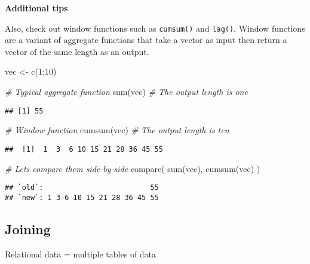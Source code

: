 \documentclass[
]{book}
\newenvironment{Shaded}{\begin{snugshade}}{\end{snugshade}}
\newcommand{\CommentTok}[1]{\textcolor[rgb]{0.56,0.35,0.01}{\textit{#1}}}
\newcommand{\DecValTok}[1]{\textcolor[rgb]{0.00,0.00,0.81}{#1}}
\newcommand{\FunctionTok}[1]{\textcolor[rgb]{0.00,0.00,0.00}{#1}}
\newcommand{\NormalTok}[1]{#1}
\newcommand{\OtherTok}[1]{\textcolor[rgb]{0.56,0.35,0.01}{#1}}
\newcommand{\SpecialCharTok}[1]{\textcolor[rgb]{0.00,0.00,0.00}{#1}}
\begin{document}
\textbf{Additional tips}

Also, check out window functions such as \texttt{cumsum()} and \texttt{lag()}. Window functions are a variant of aggregate functions that take a vector as input then return a vector of the same length as an output.

\begin{Shaded}
\begin{Highlighting}[]
\NormalTok{vec }\OtherTok{\textless{}{-}} \FunctionTok{c}\NormalTok{(}\DecValTok{1}\SpecialCharTok{:}\DecValTok{10}\NormalTok{)}

\CommentTok{\# Typical aggregate function}
\FunctionTok{sum}\NormalTok{(vec) }\CommentTok{\# The output length is one}
\end{Highlighting}
\end{Shaded}

\begin{verbatim}
## [1] 55
\end{verbatim}

\begin{Shaded}
\begin{Highlighting}[]
\CommentTok{\# Window function}
\FunctionTok{cumsum}\NormalTok{(vec) }\CommentTok{\# The output length is ten}
\end{Highlighting}
\end{Shaded}

\begin{verbatim}
##  [1]  1  3  6 10 15 21 28 36 45 55
\end{verbatim}

\begin{Shaded}
\begin{Highlighting}[]
\CommentTok{\# Let\textquotesingle{}s compare them side{-}by{-}side}
\FunctionTok{compare}\NormalTok{(}
  \FunctionTok{sum}\NormalTok{(vec),}
  \FunctionTok{cumsum}\NormalTok{(vec)}
\NormalTok{)}
\end{Highlighting}
\end{Shaded}

\begin{verbatim}
## `old`:                         55
## `new`: 1 3 6 10 15 21 28 36 45 55
\end{verbatim}

\hypertarget{joining}{%
\subsection{Joining}\label{joining}}

Relational data = multiple tables of data
\end{document}
